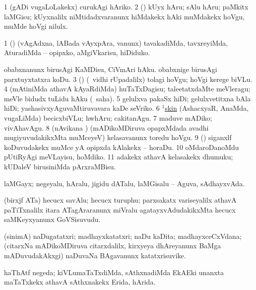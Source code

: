 \noindent
\gl{\pagu}
\bmng
\bnum
\num{1}  (gADi \mo vugaLoLakekx) curukAgi hAriko. 
\num{2}  (\birx) kUyx hAru; sAlu hAru; paMkitx laMGisu; kUyxnalilx niMtidadxvaranunx hiMdakekx hAki muMdakekx hoVgu, muMde hoVgi nilulx. 
\enum
\emng

\noindent
\gl{\nuga}
\bmng
\bnum
\num{1}  (\rUpa) (vAgAdxna, lABada vAyxpAra, \mo vanunx) tavakadiMda, tavxreyiMda, AturadiMda -- opipxko, aMgiVkarisu, hiDiduko. 
  
\banum
{} obabxnanunx birusAgi KaMDisu, CiVmAri hAku. 
 obabxnige birusAgi parxtuyxtatxra koDu. 
\eanum
\numie
\num{3}  (\AmA) (\sA\ vidhi rUpadalilx) tolagi hoVgu; hoVgi kerege biVLu. 
\num{4}  (mAtiniMda athavA kAyaRdiMda) huTaTxDagisu; taleetatxdaMte meVleragu; meVle bidudx tuLidu hAku (\rUpa\ saha). 
\num{5}  gelulxva pakaSx hiDi; gelulxvetitxna bAla hiDi; yashasivxyAguvaMtiruvavara kaDe seVriko. 
\num{6}  \hyperref{kandict_s.pdf}{S}{skin(1) pagu(4)}{$^1$skin} (AshacxyaR, AnaMda, \mo vugaLiMda) becicxbiVLu; hwhAru; cakitanAgu. 
\num{7}  maduve mADiko; vivAhavAgu. 
\num{8}  (nAvikana \vi) (mADikoMDiruva opapxMdada avadhi mugiyuvudakikxMta muMceyeV) kelasavanunx toredu hoVgu. 
\num{9}  (\AmA) siganxlf koDuvudakekx muMce yA opipxda kAlakekx -- horaDu. 
\num{10}  oMdaroDanoMdu pUtiRyAgi meVLayisu, hoMdiko. 
\num{11}  adakekx athavA kelasakekx dhumuku; kUDaleV birusiniMda pArxraMBisu. 
\enum
\emng
\eentry

\bentry
{}
\gl{\gu}
\bmng
laMGayx; negeyalu, hAralu, jigidu dATalu, laMGisalu -- Aguva, sAdhayxvAda. 
\emng
\eentry

\bentry
{}
\gl{\nA}
\bmng
(birxjf ATa) hecucx savAlu; hecucx turuphu; parxsakatx variseyalilx athavA paTiTxnalilx itara ATagAraranunx miVralu agatayxvAdudakikxMta hecucx saMKeyxyanunx GoVSisuvudu. 
\emng
\eentry

\bentry
{}
\gl{\nA}
\bmng
(sinimA) naDugatatxri; madhayxkatatxri; naDu kaDita; madhayxceCxVdana; (citarxNa mADikoMDiruva citarxdalilx, kirxyeya dhAreyanunx BaMga mADuvudakAkxgi) naDuvaNa BAgavanunx katatxrisuvike. 
\emng
\eentry

\bentry
{}
\gl{\gu}
\bmng
haThAtf negeda; kiVLumaTaTxdiMda, sAthxnadiMda EkAEki unanxta maTaTxkekx athavA sAthxnakekx Erida, hArida. 
\emng
\eentry

